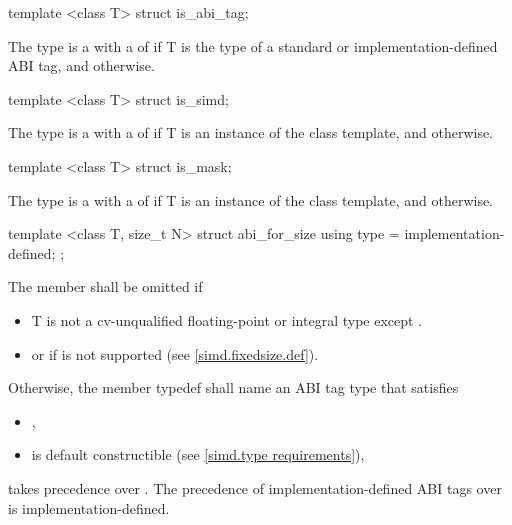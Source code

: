 \begin{itemdecl}
template <class T> struct is_abi_tag;
\end{itemdecl}
\begin{itemdescr}
  \pnum The type  is a \UnaryTypeTrait with a \BaseCharacteristic of  if \type T is the type of a standard or implementation-defined ABI tag, and  otherwise.
\end{itemdescr}

\begin{itemdecl}
template <class T> struct is_simd;
\end{itemdecl}
\begin{itemdescr}
  \pnum The type  is a \UnaryTypeTrait with a \BaseCharacteristic of  if \type T is an instance of the \simd class template, and  otherwise.
\end{itemdescr}

\begin{itemdecl}
template <class T> struct is_mask;
\end{itemdecl}
\begin{itemdescr}
  \pnum The type  is a \UnaryTypeTrait with a \BaseCharacteristic of  if \type T is an instance of the \mask class template, and  otherwise.
\end{itemdescr}

\begin{itemdecl}
template <class T, size_t N> struct abi_for_size { using type = implementation-defined; };
\end{itemdecl}
\begin{itemdescr}
  \pnum The member  shall be omitted if
  \begin{itemize}
    \item \type T is not a cv-unqualified floating-point or integral type except \bool.
    \item or if \fixedsizeN is not supported (see \ref{simd.fixedsize.def}).
  \end{itemize}

  \pnum Otherwise, the member typedef  shall name an ABI tag type that satisfies
  \begin{itemize}
    \item {},
    \item \simd[<T, type>] is default constructible (see \ref{simd.type requirements}),
  \end{itemize}
   takes precedence over \fixedsize{}.
  The precedence of implementation-defined ABI tags over \fixedsizeN is implementation-defined.
\end{itemdescr}

